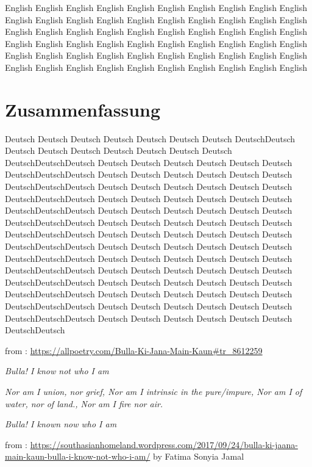 \documentclass[
]{book}
\begin{document}
English English English English English English English English English English English English English English English English English English English English English English English English English English English English English English English English English English English English English English English English English English English English English English English English English English English English English English English English English English English English

\newpage

\hypertarget{zusammenf}{%
\chapter*{Zusammenfassung}\label{zusammenf}}

Deutsch Deutsch Deutsch Deutsch Deutsch Deutsch Deutsch DeutschDeutsch Deutsch Deutsch Deutsch Deutsch Deutsch Deutsch Deutsch DeutschDeutschDeutsch Deutsch Deutsch Deutsch Deutsch Deutsch Deutsch DeutschDeutschDeutsch Deutsch Deutsch Deutsch Deutsch Deutsch Deutsch DeutschDeutschDeutsch Deutsch Deutsch Deutsch Deutsch Deutsch Deutsch DeutschDeutschDeutsch Deutsch Deutsch Deutsch Deutsch Deutsch Deutsch DeutschDeutschDeutsch Deutsch Deutsch Deutsch Deutsch Deutsch Deutsch DeutschDeutschDeutsch Deutsch Deutsch Deutsch Deutsch Deutsch Deutsch DeutschDeutschDeutsch Deutsch Deutsch Deutsch Deutsch Deutsch Deutsch DeutschDeutschDeutsch Deutsch Deutsch Deutsch Deutsch Deutsch Deutsch DeutschDeutschDeutsch Deutsch Deutsch Deutsch Deutsch Deutsch Deutsch DeutschDeutschDeutsch Deutsch Deutsch Deutsch Deutsch Deutsch Deutsch DeutschDeutschDeutsch Deutsch Deutsch Deutsch Deutsch Deutsch Deutsch DeutschDeutschDeutsch Deutsch Deutsch Deutsch Deutsch Deutsch Deutsch DeutschDeutschDeutsch Deutsch Deutsch Deutsch Deutsch Deutsch Deutsch DeutschDeutschDeutsch Deutsch Deutsch Deutsch Deutsch Deutsch Deutsch DeutschDeutsch

\newpage

from : \url{https://allpoetry.com/Bulla-Ki-Jana-Main-Kaun\#tr_8612259}

\emph{Bulla! I know not who I am}

\emph{Nor am I union, nor grief,
Nor am I intrinsic in the pure/impure,
Nor am I of water, nor of land.,
Nor am I fire nor air.}

\emph{Bulla! I known now who I am}

from : \url{https://southasianhomeland.wordpress.com/2017/09/24/bulla-ki-jaana-main-kaun-bulla-i-know-not-who-i-am/}
by Fatima Sonyia Jamal
\end{document}
